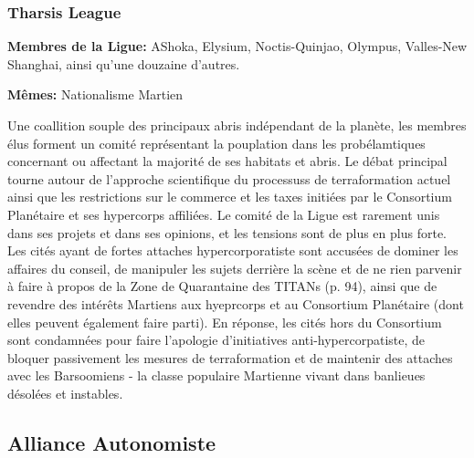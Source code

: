                               \subsubsection{Tharsis League} \label{sec:tharsis-league} 

                              \textbf{Membres de la Ligue:} AShoka, Elysium, Noctis-Quinjao, Olympus, Valles-New Shanghai, ainsi qu'une douzaine d'autres. 

                              \textbf{Mêmes:} Nationalisme Martien 

                              Une coallition souple des principaux abris indépendant de la planète, les membres élus forment un comité représentant la pouplation dans les probélamtiques concernant ou affectant la majorité de ses habitats et abris. Le débat principal tourne autour de l'approche scientifique du processuss de terraformation actuel ainsi que les restrictions sur le commerce et les taxes initiées par le Consortium Planétaire et ses hypercorps affiliées. Le comité de la Ligue est rarement unis dans ses projets et dans ses opinions, et les tensions sont de plus en plus forte. Les cités ayant de fortes attaches hypercorporatiste sont accusées de dominer les affaires du conseil, de manipuler les sujets derrière la scène et de ne rien parvenir à faire à propos  de la Zone de Quarantaine des TITANs (p. 94), ainsi que de revendre des intérêts Martiens aux hyeprcorps et au Consortium Planétaire (dont elles peuvent également faire parti). En réponse, les cités hors du Consortium sont condamnées pour faire l'apologie d'initiatives anti-hypercorpatiste, de bloquer passivement les mesures de terraformation et de maintenir des attaches avec les Barsoomiens - la classe populaire Martienne vivant dans banlieues désolées et instables. 

                              \subsection{Alliance Autonomiste} \label{sec:autonomist-alliance} 

